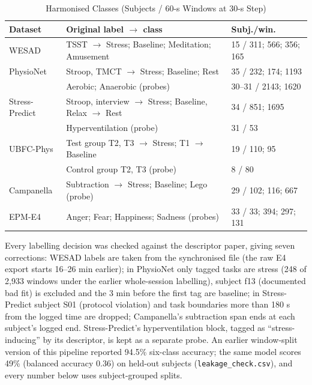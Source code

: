 \documentclass[journal]{IEEEtran}
\begin{document}
\begin{table}[!t]
\centering
\caption{Harmonised Classes (Subjects / 60-s Windows at 30-s Step)}
\label{tab:harm}
\scriptsize
\begin{tabularx}{\columnwidth}{@{}lLl@{}}
\toprule
Dataset & Original label $\rightarrow$ class & Subj./win. \\
\midrule
WESAD & TSST $\rightarrow$ Stress; Baseline; Meditation; Amusement & 15 / 311; 566; 356; 165 \\
PhysioNet & Stroop, TMCT $\rightarrow$ Stress; Baseline; Rest & 35 / 232; 174; 1193 \\
 & Aerobic; Anaerobic (probes) & 30--31 / 2143; 1620 \\
Stress-Predict & Stroop, interview $\rightarrow$ Stress; Baseline, Relax $\rightarrow$ Rest & 34 / 851; 1695 \\
 & Hyperventilation (probe) & 31 / 53 \\
UBFC-Phys & Test group T2, T3 $\rightarrow$ Stress; T1 $\rightarrow$ Baseline & 19 / 110; 95 \\
 & Control group T2, T3 (probe) & 8 / 80 \\
Campanella & Subtraction $\rightarrow$ Stress; Baseline; Lego (probe) & 29 / 102; 116; 667 \\
EPM-E4 & Anger; Fear; Happiness; Sadness (probes) & 33 / 33; 394; 297; 131 \\
\bottomrule
\end{tabularx}
\end{table}

Every labelling decision was checked against the descriptor paper, giving seven corrections: WESAD labels are taken from the synchronised file (the raw E4 export starts 16--26 min earlier); in PhysioNet only tagged tasks are stress (248 of 2,933 windows under the earlier whole-session labelling), subject f13 (documented bad fit) is excluded and the 3 min before the first tag are baseline; in Stress-Predict subject S01 (protocol violation) and task boundaries more than 180 s from the logged time are dropped; Campanella's subtraction span ends at each subject's logged end. Stress-Predict's hyperventilation block, tagged as ``stress-inducing'' by its descriptor, is kept as a separate probe. An earlier window-split version of this pipeline reported 94.5\% six-class accuracy; the same model scores 49\% (balanced accuracy 0.36) on held-out subjects (\texttt{leakage\_check.csv}), and every number below uses subject-grouped splits.
\end{document}
